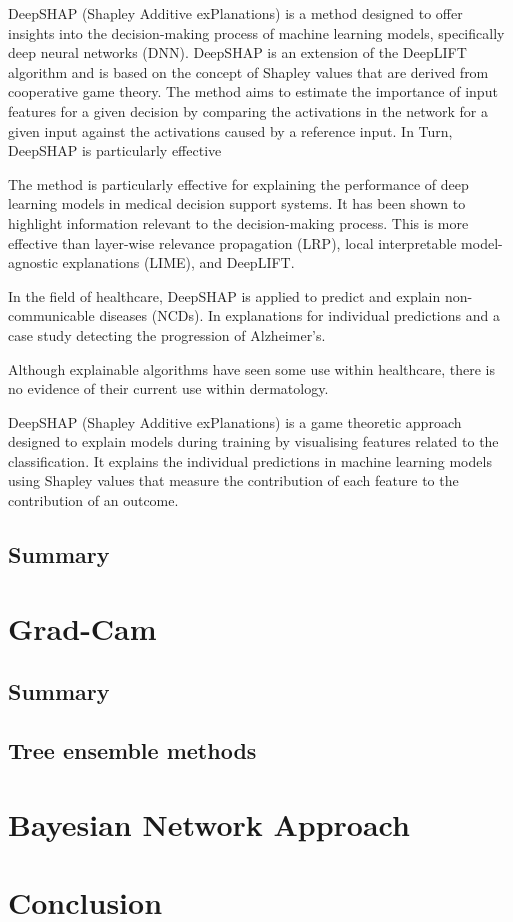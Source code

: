 DeepSHAP (Shapley Additive exPlanations) is a method designed to offer insights into the decision-making process of machine learning models, specifically deep neural networks (DNN). DeepSHAP is an extension of the DeepLIFT algorithm and is based on the concept of Shapley values that are derived from cooperative game theory. The method aims to estimate the importance of input features for a given decision by comparing the activations in the network for a given input against the activations caused by a reference input. In Turn, DeepSHAP is particularly effective

The method is particularly effective for explaining the performance of deep learning models in medical decision support systems\cite{}. It has been shown to highlight information relevant to the decision-making process. This is more effective than layer-wise relevance propagation (LRP), local interpretable model-agnostic explanations (LIME), and DeepLIFT.

In the field of healthcare, DeepSHAP is applied to predict and explain non-communicable diseases (NCDs). In explanations for individual predictions and a case study detecting the progression of Alzheimer's. 

Although explainable algorithms have seen some use within healthcare, there is no evidence of their current use within dermatology.

DeepSHAP (Shapley Additive exPlanations) is a game theoretic approach designed to explain models during training by visualising features related to the classification. It explains the individual predictions in machine learning models using Shapley values that measure the contribution of each feature to the contribution of an outcome\cite{Aas2021}.



\subsection{Summary}

\section{Grad-Cam}




\subsection{Summary}

\subsection{Tree ensemble methods}


\section{Bayesian Network Approach}


\section{Conclusion}